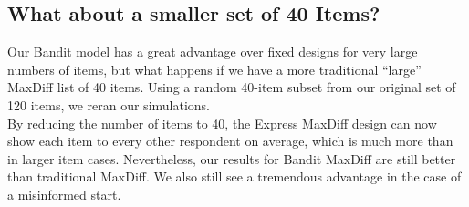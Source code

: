 \documentclass[nonblindrev]{informs3}
\begin{document}
\subsection{What about a smaller set of 40 Items?}
Our Bandit model has a great advantage over fixed designs for very large numbers of items, but what happens if we have a more traditional ``large'' MaxDiff list of 40 items. Using a random 40-item subset from our original set of 120 items, we reran our simulations. \\
By reducing the number of items to 40, the Express MaxDiff design can now show each item to every other respondent on average, which is much more than in larger item cases.
Nevertheless, our results for Bandit MaxDiff are still better than traditional MaxDiff. We also still see a tremendous advantage in the case of a misinformed start.
\end{document}

